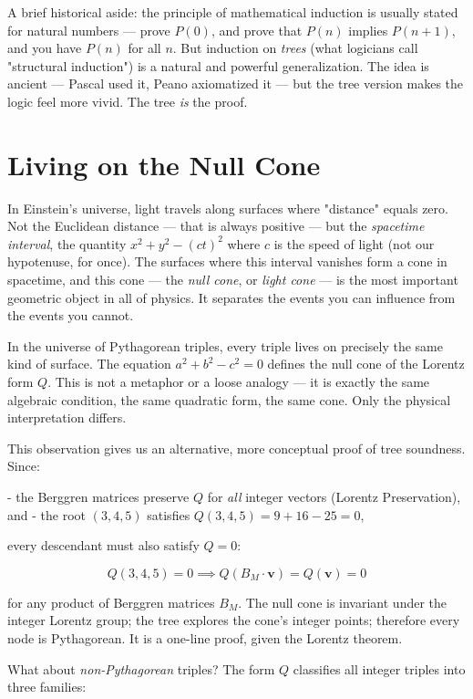 A brief historical aside: the principle of mathematical induction is usually stated for natural numbers --- prove $P(0)$, and prove that $P(n)$ implies $P(n+1)$, and you have $P(n)$ for all $n$. But induction on \textit{trees} (what logicians call "structural induction") is a natural and powerful generalization. The idea is ancient --- Pascal used it, Peano axiomatized it --- but the tree version makes the logic feel more vivid. The tree \textit{is} the proof.

\bigskip

\section*{Living on the Null Cone}

In Einstein's universe, light travels along surfaces where "distance" equals zero. Not the Euclidean distance --- that is always positive --- but the \textit{spacetime interval}, the quantity $x^2 + y^2 - (ct)^2$ where $c$ is the speed of light (not our hypotenuse, for once). The surfaces where this interval vanishes form a cone in spacetime, and this cone --- the \textit{null cone}, or \textit{light cone} --- is the most important geometric object in all of physics. It separates the events you can influence from the events you cannot.

In the universe of Pythagorean triples, every triple lives on precisely the same kind of surface. The equation $a^2 + b^2 - c^2 = 0$ defines the null cone of the Lorentz form $Q$. This is not a metaphor or a loose analogy --- it is exactly the same algebraic condition, the same quadratic form, the same cone. Only the physical interpretation differs.

This observation gives us an alternative, more conceptual proof of tree soundness. Since:

- the Berggren matrices preserve $Q$ for \textit{all} integer vectors (Lorentz Preservation), and
- the root $(3, 4, 5)$ satisfies $Q(3, 4, 5) = 9 + 16 - 25 = 0$,

every descendant must also satisfy $Q = 0$:

\[
Q(3, 4, 5) = 0 \implies Q(B_M \cdot \mathbf{v}) = Q(\mathbf{v}) = 0
\]

for any product of Berggren matrices $B_M$. The null cone is invariant under the integer Lorentz group; the tree explores the cone's integer points; therefore every node is Pythagorean. It is a one-line proof, given the Lorentz theorem.

What about \textit{non-Pythagorean} triples? The form $Q$ classifies all integer triples into three families:


